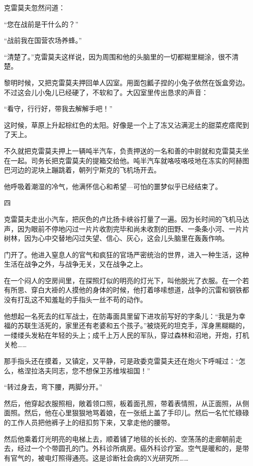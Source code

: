 克雷莫夫忽然问道：

“您在战前是干什么的？”

“战前我在国营农场养蜂。”

“清楚了。”克雷莫夫这样说，因为周围和他的头脑里的一切都糊里糊涂，很不清楚。

黎明时候，又把克雷莫夫押回单人囚室。用面包瓤子捏的小兔子依然在饭盒旁边。不过这会儿小兔儿已经硬了，不软和了。大囚室里传出恳求的声音：

“看守，行行好，带我去解解手吧！”

这时候，草原上升起棕红色的太阳。好像是一个上了冻又沾满泥土的甜菜疙瘩爬到了天上。

不久就把克雷莫夫押上一辆吨半汽车，负责押送的一名和善的中尉就和克雷莫夫坐在一起。司务长把克雷莫夫的提箱交给他。吨半汽车就咯吱咯吱地在冻实的阿赫图巴河边的泥块上蹦跳着，朝列宁斯克的飞机场开去。

他呼吸着潮湿的冷气，他满怀信心和希望—可怕的噩梦似乎已经结束了。

四

克雷莫夫走出小汽车，把灰色的卢比扬卡峡谷打量了一遍。因为长时间的飞机马达声，因为眼前不停地闪过一片片收割完毕和尚未收割的田野、一条条小河、一片片树林，因为心中交替地闪过失望、信心、灰心，这会儿头脑里在轰轰作响。

门开了。他进入窒息人的官气和疯狂的官场严密统治的世界，进入一种生活，这种生活在战争之外，与战争无关，又在战争之上。

在一个闷人的空房间里，在探照灯似的明亮的灯光下，叫他脱光了衣服。在一个若有所思、穿白大褂的人摸他的身体的时候，他打着哆嗦想道，战争的沉雷和钢铁都没有打乱这不知羞耻的手指头一丝不苟的动作。

他想起一名死去的红军战士，在防毒面具里留下进攻前写好的字条儿：“我是为幸福的苏联生活死的，家里还有老婆和五个孩子。”被烧死的坦克手，浑身黑糊糊的，一缕缕头发粘在年轻的头上；成千上万人民的军队，穿过森林和沼地，开炮，打机关枪……

那手指头还在摸着，又镇定，又平静，可是政委克雷莫夫还在炮火下呼喊过：“怎么，格涅拉洛夫同志，您不想保卫苏维埃祖国！”

“转过身去，弯下腰，两脚分开。”

然后，他穿起衣服照相，敞着领口照，板着面孔照，带着表情照，从正面照，从侧面照。然后，他在心里狠狠地骂着娘，在一张纸上盖了手印儿。然后一名忙忙碌碌的工作人员把他裤子上的纽扣剪下来，又拿走他的腰带。

然后他乘着灯光明亮的电梯上去，顺着铺了地毯的长长的、空荡荡的走廊朝前走去，经过一个个带圆孔的门。外科诊所病房。癌外科诊疗室。空气是暖和的，是带有官气的，被电灯照得通亮。这是诊断社会病的X光研究所……

